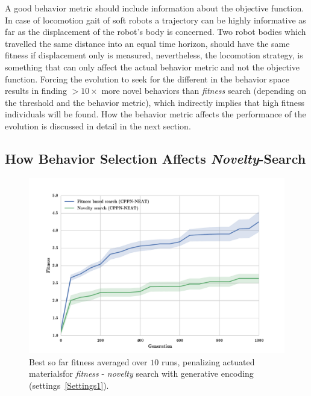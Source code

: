 A good behavior metric should include information about the objective function. In case of locomotion gait of soft robots a trajectory can be highly informative as far as the displacement of the robot's body is concerned. Two robot bodies which travelled the same distance into an equal time horizon, should have the same fitness if displacement only is measured, nevertheless, the locomotion strategy, is something that can only affect the actual behavior metric and not the objective function. Forcing the evolution to seek for the different in the behavior space results in finding $>10 \times$ more novel behaviors than \emph{fitness} search (depending on the threshold and the behavior metric), which  indirectly implies that high fitness individuals will be found. How the behavior metric affects the performance of the evolution is discussed in detail in the next section.



\subsection{How Behavior Selection Affects \emph{Novelty}-Search}

\begin{figure}
\centering
\includegraphics[width=1.0\textwidth]{../Figures/Results/FitNovSize5Pen2.pdf}
\caption[]{Best so far fitness averaged over $10$ runs, penalizing actuated materials\footnotemark for \emph{fitness} - \emph{novelty} search with generative encoding (settings~\ref{Settings1}).}
\label{fig:FitNovSize5Pen2}
\end{figure}



